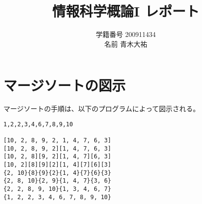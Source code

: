 \documentclass[a4j,9pt]{jsarticle}
\title{情報科学概論I レポート}
\author{学籍番号 200911434 \\ 名前 青木大祐}
\begin{document}
\maketitle
\section*{マージソートの図示}
マージソートの手順は、以下のプログラムによって図示される。


\begin{lstlisting}
1,2,2,3,4,6,7,8,9,10

[10, 2, 8, 9, 2, 1, 4, 7, 6, 3]
[10, 2, 8, 9, 2][1, 4, 7, 6, 3]
[10, 2, 8][9, 2][1, 4, 7][6, 3]
[10, 2][8][9][2][1, 4][7][6][3]
{2, 10}{8}{9}{2}{1, 4}{7}{6}{3}
{2, 8, 10}{2, 9}{1, 4, 7}{3, 6}
{2, 2, 8, 9, 10}{1, 3, 4, 6, 7}
{1, 2, 2, 3, 4, 6, 7, 8, 9, 10}
\end{lstlisting}
\end{document}

